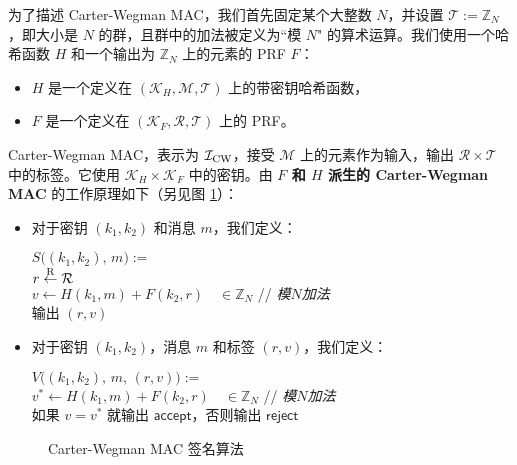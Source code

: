 为了描述 Carter-Wegman MAC，我们首先固定某个大整数 $N$，并设置 $\mathcal{T}:=\mathbb{Z}_N$，即大小是 $N$ 的群，且群中的加法被定义为``模 $N$" 的算术运算。我们使用一个哈希函数 $H$ 和一个输出为 $\mathbb{Z}_N$ 上的元素的 PRF $F$：
\begin{itemize}
	\item $H$ 是一个定义在 $(\mathcal{K}_H,\mathcal{M},\mathcal{T})$ 上的带密钥哈希函数，
	\item $F$ 是一个定义在 $(\mathcal{K}_F,\mathcal{R},\mathcal{T})$ 上的 PRF。
\end{itemize}
Carter-Wegman MAC，表示为 $\mathcal{I}_{\rm CW}$，接受 $\mathcal{M}$ 上的元素作为输入，输出 $\mathcal{R}\times\mathcal{T}$ 中的标签。它使用 $\mathcal{K}_H\times\mathcal{K}_F$ 中的密钥。由 \textbf{$F$ 和 $H$ 派生的 Carter-Wegman MAC} 的工作原理如下（另见图 \ref{fig:7-4}）：
\begin{itemize}
	\item 对于密钥 $(k_1,k_2)$ 和消息 $m$，我们定义：
	\vspace{5pt}
	
	\hspace*{5pt} $S\big((k_1,k_2),\,m\big):=$\\
	\hspace*{26pt} $r\overset{\rm R}\leftarrow\mathcal{R}$\\
	\hspace*{26pt} $v\leftarrow H(k_1,m)+F(k_2,r)\quad\in\mathbb{Z}_N$
	\quad\quad// \emph{模}$N$\emph{加法}\\
	\hspace*{26pt} 输出 $(r, v)$
	\item 对于密钥 $(k_1,k_2)$，消息 $m$ 和标签 $(r,v)$，我们定义：
	\vspace{5pt}
	
	\hspace*{5pt} $V\big((k_1,k_2),\,m,\,(r,v)\big):=$\\
	\hspace*{26pt} $v^*\leftarrow H(k_1,m)+F(k_2,r)\quad\in\mathbb{Z}_N$
	\quad\;\;// \emph{模}$N$\emph{加法}\\
	\hspace*{26pt} 如果 $v=v^*$ 就输出 $\mathsf{accept}$，否则输出 $\mathsf{reject}$
\end{itemize}

\begin{figure}
	\centering
	
	\caption{Carter-Wegman MAC 签名算法}
	\label{fig:7-4}
\end{figure}

